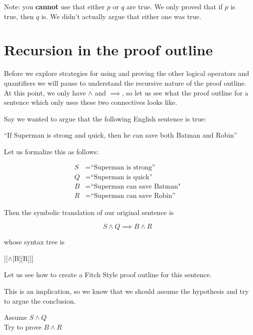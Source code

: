 \documentclass{article}
\begin{document}
Note:  you \textbf{cannot} use that either $p$ or $q$ are true.  We only proved that if $p$ is true, then $q$ is.  We didn't actually argue that either one was true.

\newpage

\section{Recursion in the proof outline}

Before we explore strategies for using and proving the other logical operators and quantifiers we will pause to understand the recursive nature of the proof outline.  At this point, we only have $\wedge$ and $\implies$, so let us see what the proof outline for a sentence which only uses these two connectives looks like.

Say we wanted to argue that the following English sentence is true:

\begin{center}
		``If Superman is strong and quick, then he can save both Batman and Robin''
	\end{center}

Let us formalize this as follows:

\begin{align*}
	S &= \textrm{``Superman is strong''}\\
	Q&= \textrm{``Superman is quick''}\\
	B &= \textrm{``Superman can save Batman"}\\
	R &= \textrm{``Superman can save Robin''}
\end{align*}

Then the symbolic translation of our original sentence is

$$
S \wedge Q \implies B \wedge R
$$

whose syntax tree is

\begin{center}
\begin{forest}
	[$\implies$[$\wedge$[S][Q]][$\wedge$[B][R]]]
	\end{forest}
\end{center}

Let us see how to create a Fitch Style proof outline for this sentence.

This is an implication, so we know that we should assume the hypothesis and try to argue the conclusion.

\begin{fitch*}
	\textrm{Assume $S \wedge Q$}\\
	\fa \textrm{Try to prove $B \wedge R$}
	\end{fitch*}
\end{document}
